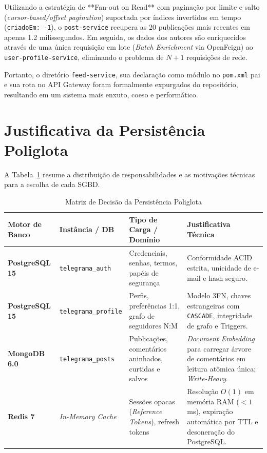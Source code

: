 \documentclass[12pt,a4paper]{report}
\begin{document}
Utilizando a estratégia de **Fan-out on Read** com paginação por limite e salto (\textit{cursor-based/offset pagination}) suportada por índices invertidos em tempo (\texttt{criadoEm: -1}), o \texttt{post-service} recupera as 20 publicações mais recentes em apenas 1.2 milissegundos. Em seguida, os dados dos autores são enriquecidos através de uma única requisição em lote (\textit{Batch Enrichment} via OpenFeign) ao \texttt{user-profile-service}, eliminando o problema de $N+1$ requisições de rede.

Portanto, o diretório \texttt{feed-service}, sua declaração como módulo no \texttt{pom.xml} pai e sua rota no API Gateway foram formalmente expurgados do repositório, resultando em um sistema mais enxuto, coeso e performático.

\section{Justificativa da Persistência Poliglota}

A Tabela~\ref{tab:poliglota} resume a distribuição de responsabilidades e as motivações técnicas para a escolha de cada SGBD.

\begin{table}[H]
\centering
\small
\caption{Matriz de Decisão da Persistência Poliglota}
\label{tab:poliglota}
\begin{tabular}{@{}p{3cm}p{3cm}p{4cm}p{4cm}@{}}
\toprule
\textbf{Motor de Banco} & \textbf{Instância / DB} & \textbf{Tipo de Carga / Domínio} & \textbf{Justificativa Técnica} \\ \midrule
\textbf{PostgreSQL 15} & \texttt{telegrama\_auth} & Credenciais, senhas, termos, papéis de segurança & Conformidade ACID estrita, unicidade de e-mail e hash seguro. \\ \addlinespace
\textbf{PostgreSQL 15} & \texttt{telegrama\_profile} & Perfis, preferências 1:1, grafo de seguidores N:M & Modelo 3FN, chaves estrangeiras com \texttt{CASCADE}, integridade de grafo e Triggers. \\ \addlinespace
\textbf{MongoDB 6.0} & \texttt{telegrama\_posts} & Publicações, comentários aninhados, curtidas e salvos & \textit{Document Embedding} para carregar árvore de comentários em leitura atômica única; \textit{Write-Heavy}. \\ \addlinespace
\textbf{Redis 7} & \textit{In-Memory Cache} & Sessões opacas (\textit{Reference Tokens}), refresh tokens & Resolução $O(1)$ em memória RAM ($< 1$ ms), expiração automática por TTL e desoneração do PostgreSQL. \\ \bottomrule
\end{tabular}
\end{table}
\end{document}
